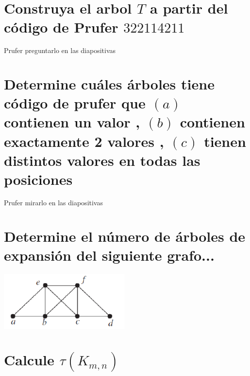 \documentclass[10pt,a4paper]{article} %
\begin{document}
    \section{Construya el arbol $T$ a partir del código de Prufer $322114211$}
        \color{red} Prufer preguntarlo en las diapositivas  \color{black}





    \section{Determine cuáles árboles tiene código de prufer que $(a)$
    contienen un valor , $(b)$ contienen exactamente 2 valores , $(c)$ tienen
    distintos valores en todas las posiciones}
        \color{red} Prufer  mirarlo en las diapositivas\color{black}




    \section{Determine el número de árboles de expansión del siguiente grafo...}
       \begin{center}
            \includegraphics[width=0.5\linewidth]{grafop7.png}
       \end{center}





   \section{Calcule $ \tau  (K_{m,n})$}



\end{document}
